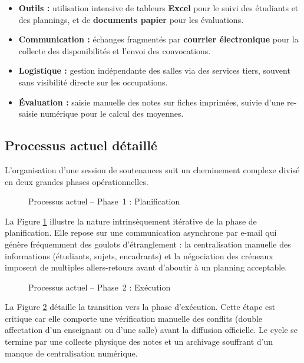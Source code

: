 \documentclass[12pt,a4paper]{article}
\begin{document}
\begin{itemize}[label=\textcolor{primary}{\textbullet}]
    \item \textbf{Outils :} utilisation intensive de tableurs \textbf{Excel}
          pour le suivi des étudiants et des plannings, et de \textbf{documents
              papier} pour les évaluations.
    \item \textbf{Communication :} échanges fragmentés par \textbf{courrier
              électronique} pour la collecte des disponibilités et l'envoi des
          convocations.
    \item \textbf{Logistique :} gestion indépendante des salles via des services
          tiers, souvent sans visibilité directe sur les occupations.
    \item \textbf{Évaluation :} saisie manuelle des notes sur fiches imprimées,
          suivie d'une re-saisie numérique pour le calcul des moyennes.
\end{itemize}

\subsection{Processus actuel détaillé}
\label{subsec:processus_actuel}

L'organisation d'une session de soutenances suit un cheminement complexe divisé
en deux grandes phases opérationnelles.

\begin{figure}[H]
    \centering
    \caption{Processus actuel -- Phase~1 : Planification}
    \label{fig:processus_actuel_phase1}
\end{figure}

La Figure \ref{fig:processus_actuel_phase1} illustre la nature intrinsèquement
itérative de la phase de planification. Elle repose sur une communication
asynchrone par e-mail qui génère fréquemment des goulots d'étranglement : la
centralisation manuelle des informations (étudiants, sujets, encadrants) et la
négociation des créneaux imposent de multiples allers-retours avant d'aboutir à
un planning acceptable.

\begin{figure}[H]
    \centering
    \caption{Processus actuel -- Phase~2 : Exécution}
    \label{fig:processus_actuel_phase2}
\end{figure}


La Figure \ref{fig:processus_actuel_phase2} détaille la transition vers la phase
d'exécution. Cette étape est critique car elle comporte une vérification
manuelle des conflits (double affectation d'un enseignant ou d'une salle) avant
la diffusion officielle. Le cycle se termine par une collecte physique des notes
et un archivage souffrant d'un manque de centralisation numérique.
\end{document}

